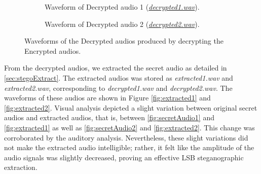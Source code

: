 \documentclass[a4paper]{cas-sc}
\begin{document}
\begin{figure}[pos=h]
    \begin{subfigure}[h]{0.45\textwidth}
        \begin{center}
            
            \caption{Waveform of Decrypted audio 1 (\href{https://drive.google.com/file/d/1BbYutJlHVgVStUuAX9_TGZQJQnQrmKWd/view?usp=drive_link}{\textit{decrypted1.wav}}).}
            \label{fig:decrypted1}
        \end{center}
    \end{subfigure}
    \hfill
    \begin{subfigure}[h]{0.45\textwidth}
        \begin{center}
            
            \caption{Waveform of Decrypted audio 2 (\href{https://drive.google.com/file/d/1NXJOFLN7jP7fxDNhsJQ88p4ldTJE_9Pe/view?usp=drive_link}{\textit{decrypted2.wav}}).}
            \label{fig:decrypted2}
        \end{center}
    \end{subfigure}
    \caption{Waveforms of the Decrypted audios produced by decrypting the Encrypted audios.}
\end{figure}

From the decrypted audios, we extracted the secret audio as detailed in \ref{sec:stegoExtract}. The extracted audios was stored as \textit{extracted1.wav} and \textit{extracted2.wav}, corresponding to \textit{decrypted1.wav} and \textit{decrypted2.wav}. The waveforms of these audios are shown in Figure \ref{fig:extracted1} and \ref{fig:extracted2}. Visual analysis depicted a slight variation between original secret audios and extracted audios, that is, between \ref{fig:secretAudio1} and \ref{fig:extracted1} as well as \ref{fig:secretAudio2} and \ref{fig:extracted2}. This change was corroborated by the auditory analysis. Nevertheless, these slight variations did not make the extracted audio intelligible; rather, it felt like the amplitude of the audio signals was slightly decreased, proving an effective LSB steganographic extraction.
\end{document}
